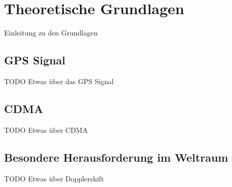 \chapter{Theoretische Grundlagen}
Einleitung zu den Grundlagen

\section{GPS Signal}
TODO Etwas über das GPS Signal

\section{CDMA}
TODO Etwas über CDMA

\section{Besondere Herausforderung im Weltraum}
TODO Etwas über Dopplershift